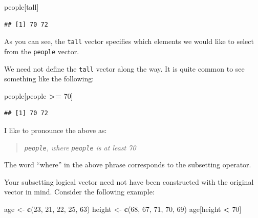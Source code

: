 \documentclass[]{book}
\makeatletter
\newenvironment{Shaded}{\begin{snugshade}}{\end{snugshade}}
\newcommand{\KeywordTok}[1]{\textcolor[rgb]{0.13,0.29,0.53}{\textbf{#1}}}
\newcommand{\DecValTok}[1]{\textcolor[rgb]{0.00,0.00,0.81}{#1}}
\newcommand{\StringTok}[1]{\textcolor[rgb]{0.31,0.60,0.02}{#1}}
\newcommand{\OperatorTok}[1]{\textcolor[rgb]{0.81,0.36,0.00}{\textbf{#1}}}
\newcommand{\NormalTok}[1]{#1}
\newenvironment{kframe}{%
\medskip{}
\setlength{\fboxsep}{.8em}
 \def\at@end@of@kframe{}%
 \ifinner\ifhmode%
  \def\at@end@of@kframe{\end{minipage}}%
  \begin{minipage}{\columnwidth}%
 \fi\fi%
 \def\FrameCommand##1{\hskip\@totalleftmargin \hskip-\fboxsep
 \colorbox{shadecolor}{##1}\hskip-\fboxsep
     \hskip-\linewidth \hskip-\@totalleftmargin \hskip\columnwidth}%
 \MakeFramed {\advance\hsize-\width
   \@totalleftmargin\z@ \linewidth\hsize
   \@setminipage}}%
 {\par\unskip\endMakeFramed%
 \at@end@of@kframe}
\renewenvironment{Shaded}{\begin{kframe}}{\end{kframe}}
\theoremstyle{definition}
\theoremstyle{definition}
\theoremstyle{definition}
\theoremstyle{remark}
\makeatother
\begin{document}
\begin{Shaded}
\begin{Highlighting}[]
\NormalTok{people[tall]}
\end{Highlighting}
\end{Shaded}

\begin{verbatim}
## [1] 70 72
\end{verbatim}

As you can see, the \texttt{tall} vector specifies which elements we
would like to select from the \texttt{people} vector.

We need not define the \texttt{tall} vector along the way. It is quite
common to see something like the following:

\begin{Shaded}
\begin{Highlighting}[]
\NormalTok{people[people }\OperatorTok{>=}\StringTok{ }\DecValTok{70}\NormalTok{]}
\end{Highlighting}
\end{Shaded}

\begin{verbatim}
## [1] 70 72
\end{verbatim}

I like to pronounce the above as:

\begin{quote}
\emph{\texttt{people}, where \texttt{people} is at least 70}
\end{quote}

The word ``where'' in the above phrase corresponds to the subsetting
operator.

Your subsetting logical vector need not have been constructed with the
original vector in mind. Consider the following example:

\begin{Shaded}
\begin{Highlighting}[]
\NormalTok{age <-}\StringTok{ }\KeywordTok{c}\NormalTok{(}\DecValTok{23}\NormalTok{, }\DecValTok{21}\NormalTok{, }\DecValTok{22}\NormalTok{, }\DecValTok{25}\NormalTok{, }\DecValTok{63}\NormalTok{)}
\NormalTok{height <-}\StringTok{ }\KeywordTok{c}\NormalTok{(}\DecValTok{68}\NormalTok{, }\DecValTok{67}\NormalTok{, }\DecValTok{71}\NormalTok{, }\DecValTok{70}\NormalTok{, }\DecValTok{69}\NormalTok{)}
\NormalTok{age[height }\OperatorTok{<}\StringTok{ }\DecValTok{70}\NormalTok{]}
\end{Highlighting}
\end{Shaded}
\end{document}
